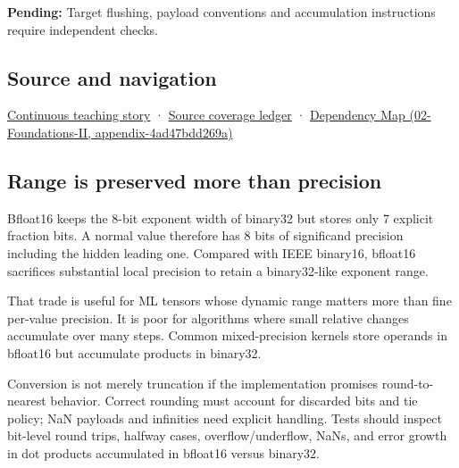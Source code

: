 \textbf{Pending:} Target flushing, payload conventions and accumulation instructions require independent checks.

\subsection{Source and navigation}\label{source-and-navigation}

\href{Continuous\%20Notes/Computing\%20Foundations\%20-\%20From\%20Bits\%20to\%20C++\%20and\%20Systems\%20APIs\#Choosing\%20what\%20information\%20to\%20keep}{Continuous teaching story} · \hyperref[appendix-fd090d982a15]{Source coverage ledger} · \href{}{Dependency Map (02-Foundations-II, appendix-4ad47bdd269a)}

\subsection{Range is preserved more than precision}\label{range-is-preserved-more-than-precision}

Bfloat16 keeps the 8-bit exponent width of binary32 but stores only 7 explicit fraction bits. A normal value therefore has 8 bits of significand precision including the hidden leading one. Compared with IEEE binary16, bfloat16 sacrifices substantial local precision to retain a binary32-like exponent range.

That trade is useful for ML tensors whose dynamic range matters more than fine per-value precision. It is poor for algorithms where small relative changes accumulate over many steps. Common mixed-precision kernels store operands in bfloat16 but accumulate products in binary32.

Conversion is not merely truncation if the implementation promises round-to-nearest behavior. Correct rounding must account for discarded bits and tie policy; NaN payloads and infinities need explicit handling. Tests should inspect bit-level round trips, halfway cases, overflow/underflow, NaNs, and error growth in dot products accumulated in bfloat16 versus binary32.
